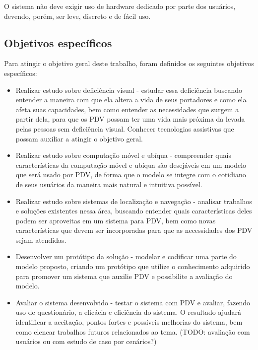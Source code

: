 \documentclass[english,brazilian]{UNISINOSmonografia}
\begin{document}
		O sistema não deve exigir uso de hardware dedicado por parte dos usuários, devendo, porém, ser leve, discreto e de fácil uso.
		
		\subsection{Objetivos específicos}
		Para atingir o objetivo geral deste trabalho, foram definidos os seguintes objetivos específicos:

		\begin{itemize}
			\item Realizar estudo sobre deficiência visual - estudar essa deficiência buscando entender a maneira com que ela altera a vida de seus portadores e como ela afeta suas capacidades, bem como entender as necessidades que surgem a partir dela, para que os PDV possam ter uma vida mais próxima da levada pelas pessoas sem deficiência visual. Conhecer tecnologias assistivas que possam auxiliar a atingir o objetivo geral.

			\item Realizar estudo sobre computação móvel e ubíqua - compreender quais características da computação móvel e ubíqua são desejáveis em um modelo que será usado por PDV, de forma que o modelo se integre com o cotidiano de seus usuários da maneira mais natural e intuitiva possível.

			\item Realizar estudo sobre sistemas de localização e navegação - analisar trabalhos e soluções existentes nessa área, buscando entender quais características deles podem ser aproveitas em um sistema para PDV, bem como novas características que devem ser incorporadas para que as necessidades dos PDV sejam atendidas.

			\item Desenvolver um protótipo da solução - modelar e codificar uma parte do modelo proposto, criando um protótipo que utilize o conhecimento adquirido para promover um sistema que auxilie PDV e 
			possibilite a avaliação do modelo.

			\item Avaliar o sistema desenvolvido - testar o sistema com PDV e avaliar, fazendo uso de questionário, a eficácia e eficiência do sistema. O resultado ajudará identificar a aceitação, pontos fortes e possíveis melhorias do sistema, bem como elencar trabalhos futuros relacionados ao tema. (TODO: avaliação com usuários ou com estudo de caso por cenários?) 
		\end{itemize}
\end{document}
